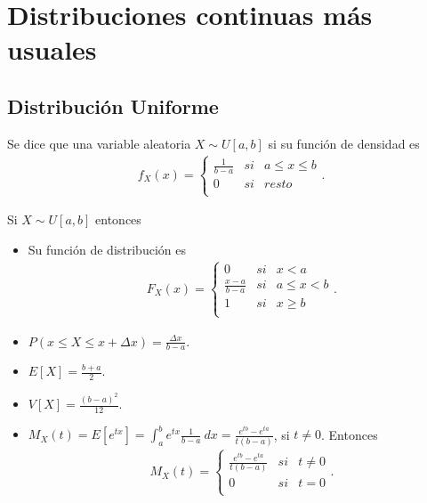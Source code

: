 \chapter{Distribuciones continuas más usuales}

\section{Distribución Uniforme}

\begin{defi}
Se dice que una variable aleatoria $X \sim U[a,b]$ si su función de densidad es 
\begin{align*}
    f_X(x) = \left\{ \begin{array}{lcc}
             \frac{1}{b - a} &  si  & a \leq x \leq b\\
             0 &  si  & resto\\
             \end{array}
        \right. .
\end{align*}
\end{defi}

\begin{obs}
Si $X \sim U[a,b]$ entonces
\begin{itemize}
    \item Su función de distribución es
    \begin{align*}
        F_X(x) = \left\{ \begin{array}{lcc}
             0 &  si  & x < a\\
             \frac{x - a}{b - a} &  si  & a \leq x < b\\
             1 &  si  & x \ge b\\
             \end{array}
        \right. .
    \end{align*}
    \item $P(x \leq X \leq x + \Delta x) = \frac{\Delta x}{b - a}$.
    \item $E[X] = \frac{b + a}{2}$.
    \item $V[X] = \frac{(b -a)^2}{12}$.
    \item $M_X(t) = E[e^{tx}] = \int_{a}^{b}{e^{tx}\frac{1}{b -a } \ dx} = \frac{e^{tb} - e^{ta}}{t(b -a )}$, si $t \not = 0$. Entonces
    \begin{align*}
        M_X(t) = \left\{ \begin{array}{lcc}
             \frac{e^{tb} - e^{ta}}{t(b -a )} &  si  & t \not = 0\\
             0 &  si  & t = 0\\
             \end{array}
        \right. .
    \end{align*}
\end{itemize}
\end{obs}

